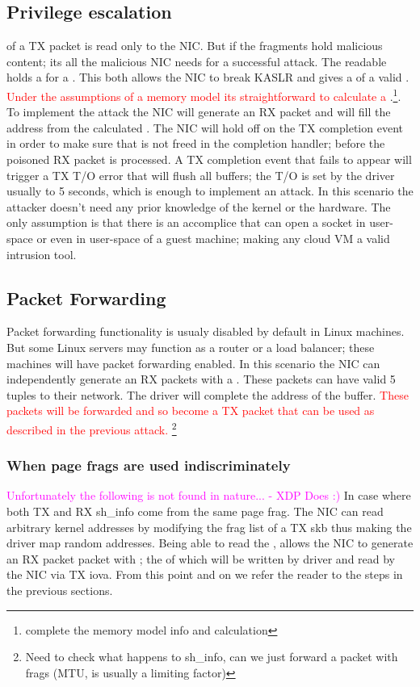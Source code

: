 \subsection{Privilege escalation}
\shinfo of a TX packet is read only to the NIC.
But if the fragments hold malicious content; its all the malicious NIC needs for a successful attack. The readable \shinfo holds a \kva for a \page. This both allows the NIC to break KASLR and gives a \kva of a valid \mabaf. \textcolor{red}{Under the assumptions of a memory model its straightforward to calculate a \kva}.\footnote{complete the memory model info and calculation}. To implement the attack the NIC will generate an RX packet and will fill the \uarg address from the calculated \kva.
The NIC will hold off on the TX completion event in order to make sure that \kva is not freed in the completion handler; before the poisoned RX packet is processed. A TX completion event that fails to appear will trigger a TX T/O error that will flush all buffers; the T/O is set by the driver usually to 5 seconds, which is enough to implement an attack.\newline
In this scenario the attacker doesn't need any prior knowledge of the kernel or the hardware. The only assumption is that there is an accomplice that can open a socket in user-space or even in user-space of a guest machine; making any cloud VM a valid intrusion tool.

\subsection{Packet Forwarding}
Packet forwarding functionality is usualy disabled by default in Linux machines. But some Linux servers may function as a router or a load balancer; these machines will have packet forwarding enabled. In this scenario the NIC can independently generate an RX packets with a \mabaf. These packets can have valid 5 tuples to their network. The driver will complete the \page address of the buffer. \textcolor{red}{These packets will be forwarded and so become a TX packet that can be used as described in the previous attack.} \footnote{Need to check what happens to sh\_info, can we just forward a packet with frags (MTU, is usually a limiting factor)}

\subsubsection{When page frags are used indiscriminately}
\textcolor{magenta}{Unfortunately the following is not found in nature... - XDP Does :)}\newline
In case where both TX and RX sh\_info come from the same page frag. The NIC can read arbitrary kernel addresses by modifying the frag list of a TX skb thus making the driver map random addresses.
Being able to read the \shinfo, allows the NIC to generate an RX packet packet with \mabaf; the \kva of which will be written by driver and read by the NIC via TX iova. From this point and on we refer the reader to the steps in the previous sections.
